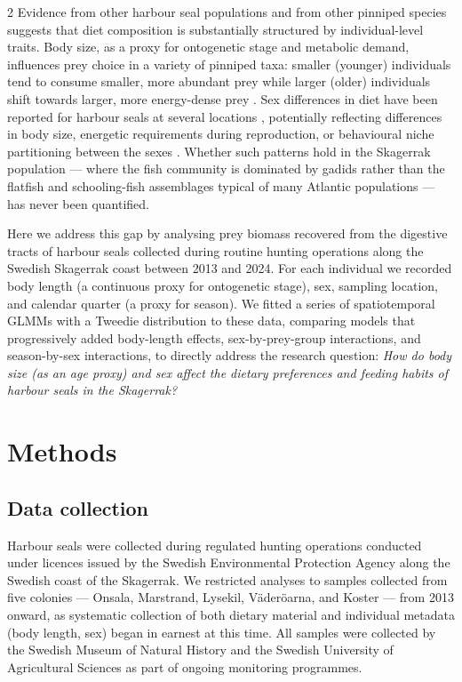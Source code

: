 \begin{spacing}{2}
Evidence from other harbour seal populations and from other pinniped species
suggests that diet composition is substantially structured by individual-level
traits. Body size, as a proxy for ontogenetic stage and metabolic demand,
influences prey choice in a variety of pinniped taxa: smaller (younger)
individuals tend to consume smaller, more abundant prey while larger (older)
individuals shift towards larger, more energy-dense prey
\citep{Pitcher1980, Young2010, Neises2021}. Sex differences in diet have
been reported for harbour seals at several locations
\citep{WilsonHammond2016, Conwell2024}, potentially reflecting differences
in body size, energetic requirements during reproduction, or behavioural
niche partitioning between the sexes \citep{HansenHarding2006}. Whether
such patterns hold in the Skagerrak population --- where the fish community
is dominated by gadids rather than the flatfish and schooling-fish
assemblages typical of many Atlantic populations --- has never been
quantified.

Here we address this gap by analysing prey biomass recovered from the
digestive tracts of harbour seals collected during routine hunting
operations along the Swedish Skagerrak coast between 2013 and 2024. For
each individual we recorded body length (a continuous proxy for ontogenetic
stage), sex, sampling location, and calendar quarter (a proxy for season).
We fitted a series of spatiotemporal GLMMs with a Tweedie distribution to
these data, comparing models that progressively added body-length effects,
sex-by-prey-group interactions, and season-by-sex interactions, to directly
address the research question: \textit{How do body size (as an age proxy)
and sex affect the dietary preferences and feeding habits of harbour seals
in the Skagerrak?}

\section{Methods}

\subsection{Data collection}

Harbour seals were collected during regulated hunting operations conducted
under licences issued by the Swedish Environmental Protection Agency along
the Swedish coast of the Skagerrak. We restricted analyses to samples
collected from five colonies --- Onsala, Marstrand, Lysekil,
V{\"a}der{\"o}arna, and Koster --- from 2013 onward, as systematic
collection of both dietary material and individual metadata (body length,
sex) began in earnest at this time. All samples were collected by the
Swedish Museum of Natural History and the Swedish University of Agricultural
Sciences as part of ongoing monitoring programmes.


\end{spacing}
